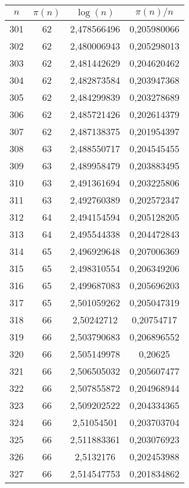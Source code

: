{\begin{minipage}[!h]{0.45\textwidth}\centering
\tiny
\begin{longtable}{cccc} \hline
\(n\) & \(\pi(n)\) & \(\log(n)\) & \(\pi(n)/n\) \\ \hline
301 & 62 & 2,478566496 & 0,205980066 \\ \hline
302 & 62 & 2,480006943 & 0,205298013 \\ \hline
303 & 62 & 2,481442629 & 0,204620462 \\ \hline
304 & 62 & 2,482873584 & 0,203947368 \\ \hline
305 & 62 & 2,484299839 & 0,203278689 \\ \hline
306 & 62 & 2,485721426 & 0,202614379 \\ \hline
307 & 62 & 2,487138375 & 0,201954397 \\ \hline
308 & 63 & 2,488550717 & 0,204545455 \\ \hline
309 & 63 & 2,489958479 & 0,203883495 \\ \hline
310 & 63 & 2,491361694 & 0,203225806 \\ \hline
311 & 63 & 2,492760389 & 0,202572347 \\ \hline
312 & 64 & 2,494154594 & 0,205128205 \\ \hline
313 & 64 & 2,495544338 & 0,204472843 \\ \hline
314 & 65 & 2,496929648 & 0,207006369 \\ \hline
315 & 65 & 2,498310554 & 0,206349206 \\ \hline
316 & 65 & 2,499687083 & 0,205696203 \\ \hline
317 & 65 & 2,501059262 & 0,205047319 \\ \hline
318 & 66 & 2,50242712 & 0,20754717 \\ \hline
319 & 66 & 2,503790683 & 0,206896552 \\ \hline
320 & 66 & 2,505149978 & 0,20625 \\ \hline
321 & 66 & 2,506505032 & 0,205607477 \\ \hline
322 & 66 & 2,507855872 & 0,204968944 \\ \hline
323 & 66 & 2,509202522 & 0,204334365 \\ \hline
324 & 66 & 2,51054501 & 0,203703704 \\ \hline
325 & 66 & 2,511883361 & 0,203076923 \\ \hline
326 & 66 & 2,5132176 & 0,202453988 \\ \hline
327 & 66 & 2,514547753 & 0,201834862 \\ \hline

\end{longtable}
\end{minipage}}
